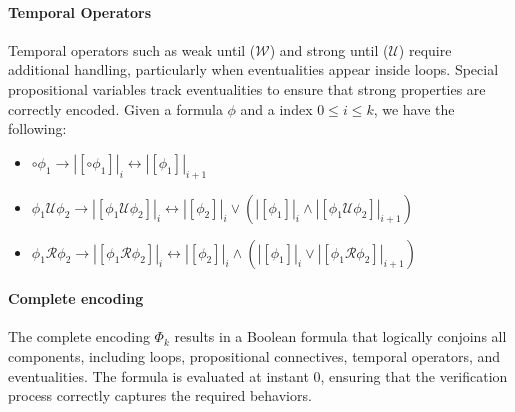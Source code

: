 \paragraph*{Temporal Operators}
Temporal operators such as weak until ($\mathcal{W}$) and strong until ($\mathcal{U}$) require additional handling, particularly when eventualities appear inside loops.
Special propositional variables track eventualities to ensure that strong properties are correctly encoded.
Given a formula $\phi$ and a index $0\leq i\leq k$, we have the following: 
\begin{itemize}
    \item $\circ\phi_1\rightarrow{\left\lvert [\circ\phi_1]\right\rvert}_i\leftrightarrow{\left\lvert [\phi_1]\right\rvert}_{i+1}$
    \item $\phi_1\mathcal{U}\phi_2\rightarrow{\left\lvert [\phi_1\mathcal{U}\phi_2]\right\rvert}_i\leftrightarrow{\left\lvert [\phi_2]\right\rvert}_i\lor\left({\left\lvert [\phi_1]\right\rvert}_i\land {\left\lvert [\phi_1\mathcal{U}\phi_2]\right\rvert}_{i+1}\right)$
    \item $\phi_1\mathcal{R}\phi_2\rightarrow{\left\lvert [\phi_1\mathcal{R}\phi_2]\right\rvert}_i\leftrightarrow{\left\lvert [\phi_2]\right\rvert}_i\land\left({\left\lvert [\phi_1]\right\rvert}_i\lor {\left\lvert [\phi_1\mathcal{R}\phi_2]\right\rvert}_{i+1}\right)$
\end{itemize}

\paragraph*{Complete encoding}
The complete encoding $\Phi_k$ results in a Boolean formula that logically conjoins all components, including loops, propositional connectives, temporal operators, and eventualities.
The formula is evaluated at instant 0, ensuring that the verification process correctly captures the required behaviors.

